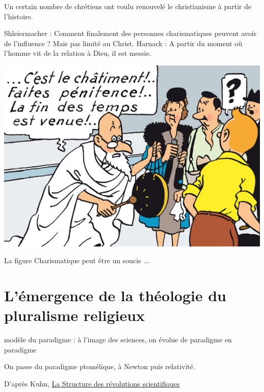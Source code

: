 Un certain nombre de chrétiens ont voulu renouvelé le christianisme à partir de l'histoire. 

Shleiermacher :  Comment finalement des personnes charismatiques peuvent avoir de l'influence ? Mais pas limité au Christ.
Harnack : A partir du moment où l'homme vit de la relation à Dieu, il est messie.
\begin{marginfigure}
\includegraphics[width=\textwidth]{ChristologiePluraliste/Images/TintinFindesTemps.jpg}
\caption{La figure Charismatique peut être un soucis ...}

\end{marginfigure}



\section{L’émergence de la théologie du pluralisme religieux}

\begin{Def}
modèle du paradigme : à l'image des sciences, on évolue de paradigme en paradigme
\end{Def}

\begin{Ex}
On passe du paradigme ptomélique, à Newton puis relativité.
\end{Ex}

D'après Kuhn, \href{https://fr.wikipedia.org/wiki/La_Structure_des_r%C3%A9volutions_scientifiques}{La Structure des révolutions scientifiques} 



